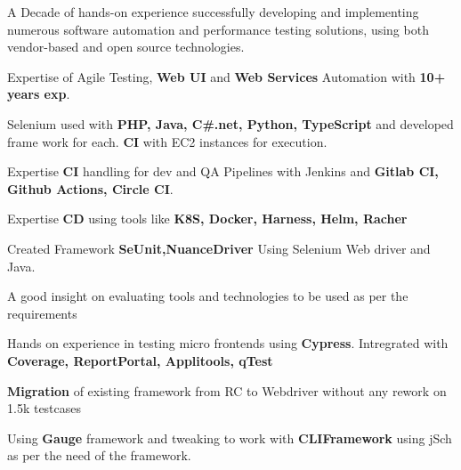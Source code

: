 

\begin{cventries}
\begin{cvitemize}
 \item {A Decade of hands-on experience successfully developing and implementing numerous software automation and performance testing solutions, using both vendor-based and open source technologies.}
 \item {Expertise of Agile Testing, \textbf{Web UI} and \textbf{Web Services} Automation with \textbf{10+ years exp}.}

 \item {Selenium used with \textbf{PHP, Java, C\#.net, Python, TypeScript} and developed frame work for each. \textbf{CI} with EC2 instances for execution.}
 
 \item {Expertise \textbf{CI} handling for dev and QA Pipelines with Jenkins and \textbf{Gitlab CI, Github Actions, Circle CI}}.
 
 \item  {Expertise \textbf{CD} using tools like \textbf{K8S, Docker, Harness, Helm, Racher}}

 \item {Created Framework \textbf{SeUnit,NuanceDriver} Using Selenium Web driver and Java.}
 
 \item {A good insight on evaluating tools and technologies to be used as per the requirements}
 
 \item {Hands on experience in testing micro frontends using \textbf{Cypress}. Intregrated with \textbf{Coverage, ReportPortal, Applitools, qTest}} 

 \item {\textbf{Migration} of existing framework from RC to Webdriver without any rework on 1.5k testcases}

 \item {Using \textbf{Gauge} framework and tweaking to work with \textbf{CLIFramework} using jSch as per the need of the framework.}


\end{cvitemize}
\end{cventries}
